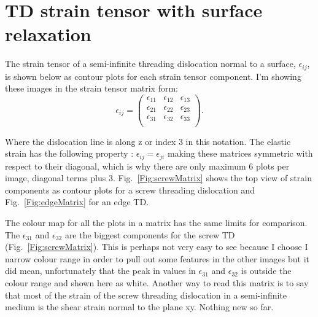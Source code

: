 \chapter{TD strain tensor with surface relaxation}
\label{Chap:strainMatrix}

The strain tensor of a semi-infinite threading dislocation normal to a surface, $\epsilon_{ij}$,  is shown below as contour plots for each strain tensor component. I'm showing these images in the strain tensor matrix form:
\begin{equation*}
    \epsilon_{ij} = \begin{pmatrix}
    \epsilon_{11} & \epsilon_{12} & \epsilon_{13} \\
    \epsilon_{21} & \epsilon_{22} & \epsilon_{23} \\
    \epsilon_{31} & \epsilon_{32} & \epsilon_{33} \\
    \end{pmatrix}.
\end{equation*}

Where the dislocation line is along z or index 3 in this notation. The elastic strain has the following property : $\epsilon_{ij}=\epsilon_{ji}$ making these matrices symmetric with respect to their diagonal, which is why there are only maximum 6 plots per image, \ie diagonal terms plus 3. Fig.~\ref{Fig:screwMatrix} shows the top view of strain components as contour plots for a screw threading dislocation and   Fig.~\ref{Fig:edgeMatrix} for an edge TD. 

The colour map for all the plots in a matrix has the same limits for comparison. The $\epsilon_31$ and $\epsilon_32$ are the biggest components for the screw TD (Fig.~\ref{Fig:screwMatrix}). This is perhaps not very easy to see because I choose I narrow colour range in order to pull out some features in the other images but it did mean, unfortunately that the peak in values in $\epsilon_31$ and $\epsilon_32$ is outside the colour range and shown here as white. Another way to read this matrix is to say that most of the strain of the screw threading dislocation in a semi-infinite medium is the shear strain normal to the plane xy. Nothing new so far. 

